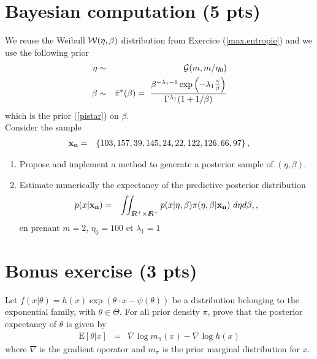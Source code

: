 \documentclass[10pt]{article}
\newcommand{\R}{I\!\!R}
\newcommand{\E}{\mbox{E}}
\newcommand{\1}{\mathbbm{1}}
\begin{document}
\section{Bayesian computation (5 pts)}

We reuse the Weibull ${\cal{W}}(\eta,\beta)$ distribution from Exercice (\ref{max.entropie}) and we use the following prior 
\begin{eqnarray*}
\eta & \sim & {\cal{G}}(m,m/\eta_0) \\
\beta & \sim & \tilde{\pi}^*(\beta)  = \ \frac{\beta^{-\lambda_1-1}\exp\left(-\lambda_1 \frac{\gamma}{\beta}\right)}{\Gamma^{\lambda_1}(1+1/\beta)}
\end{eqnarray*}
which is the prior (\ref{pistar}) on $\beta$. \\

Consider the sample
\begin{eqnarray*}
{\bf x_n} & = & \left\{ 103, 157 , 39 ,145 , 24  ,22 ,122, 126 , 66 , 97\right\},
\end{eqnarray*}
\begin{enumerate}
\item Propose and implement a method to generate a posterior sample of  $(\eta,\beta)$. 
\item Estimate numerically the expectancy of the predictive posterior distribution 
\begin{eqnarray*}
p(x|{\bf x_n}) & = & \iint_{\R^+\times\R^+} p(x|\eta,\beta) \pi(\eta,\beta|{\bf x_n}) \ d\eta d\beta,,
\end{eqnarray*}
 en prenant $m=2$, $\eta_0=100$ et $\lambda_1=1$ 
\end{enumerate}



\section{Bonus exercise (3 pts)}

Let $f(x|\theta) = h(x)\exp\left(\theta\cdot x - \psi(\theta)\right)$ be a distribution belonging to the exponential family, with $\theta\in\Theta$. For all prior density $\pi$, prove that the posterior expectancy of $\theta$ is given by
\begin{eqnarray*}
\E[\theta|x] & = & \nabla \log m_{\pi}(x) - \nabla \log h(x)
\end{eqnarray*}
where $\nabla$ is the gradient operator and  $m_{\pi}$ is the prior marginal distribution for $x$.
\end{document}
